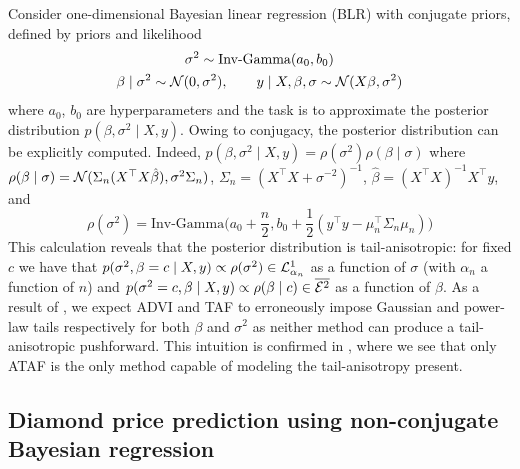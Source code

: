 \documentclass[twoside]{article}
\theoremstyle{definition}
\theoremstyle{remark}
\begin{document}
Consider one-dimensional Bayesian linear regression (BLR)
with conjugate priors, defined by priors and likelihood
\begin{gather*}
    \sigma^2 \sim \text{Inv-Gamma}(a_0, b_0)\\
    \beta \mid \sigma^2 \sim \mathcal{N}(0, \sigma^2),\qquad
    y \mid X, \beta, \sigma \sim \mathcal{N}(X \beta, \sigma^2) 
\end{gather*}
where $a_0$, $b_0$ are hyperparameters and the task is to approximate the posterior
distribution $p(\beta,\sigma^2 \mid X, y)$. Owing to conjugacy,
the posterior distribution can be explicitly computed. Indeed, $p(\beta,\sigma^2 \mid X, y) = \rho(\sigma^2)\rho(\beta \mid \sigma)$ where $\rho(\beta \mid \sigma) = \mathcal{N}(\Sigma_n(X^\top X \hat\beta), \sigma^2 \Sigma_n)$, $\Sigma_n = (X^\top X + \sigma^{-2})^{-1}$, $\hat\beta = (X^\top X)^{-1} X^\top y$, and
    \[
    \rho(\sigma^2) = \text{Inv-Gamma}\bigg(
    a_0 + \frac{n}{2}, 
    b_0 + \frac{1}{2}(y^\top y - \mu_n^\top \Sigma_n \mu_n)\bigg)%
    \]
This calculation reveals that the posterior distribution is tail-anisotropic:
for fixed $c$ we have that $p(\sigma^2, \beta=c \mid X, y) \propto \rho(\sigma^2) \in \mathcal{L}^1_{\alpha_n}$
as a function of $\sigma$ (with $\alpha_n$ a function of $n$)
and $p(\sigma^2=c, \beta \mid X, y) \propto \rho(\beta \mid c) \in \overline{\mathcal{E}^2}$
as a function of $\beta$.
As a result of , we expect ADVI and TAF to erroneously impose
Gaussian and power-law tails respectively for both $\beta$ and $\sigma^2$ as neither method
can produce a tail-anisotropic pushforward. This intuition is confirmed in ,
where we see that only ATAF is the only method capable of modeling the tail-anisotropy present.

\subsection{Diamond price prediction using non-conjugate Bayesian regression}
\label{ssec:diamonds}
\end{document}
